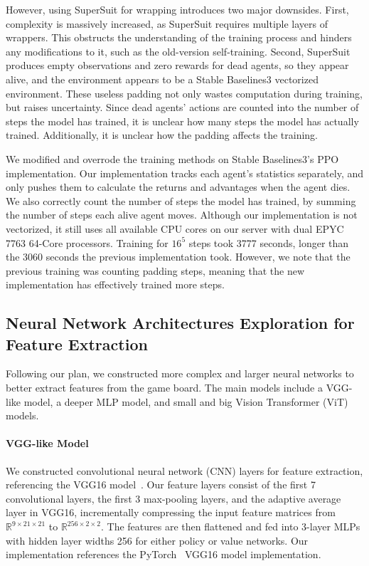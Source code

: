 \documentclass[conference]{IEEEtran}
\begin{document}
However, using SuperSuit for wrapping introduces two major downsides. First,
complexity is massively increased,
as SuperSuit requires multiple layers of wrappers.
This obstructs the understanding of the training process and hinders any
modifications to it, such as the old-version self-training. Second,
SuperSuit produces empty observations and zero rewards for dead agents,
so they appear alive,
and the environment appears to be a Stable Baselines3 vectorized environment.
These useless padding not only wastes computation during training,
but raises uncertainty.
Since dead agents' actions are counted into the number of steps the model has
trained, it is unclear how many steps the model has actually trained.
Additionally, it is unclear how the padding affects the training.

We modified and overrode the training methods on Stable Baselines3's PPO
implementation. Our implementation tracks each agent's statistics separately,
and only pushes them to calculate the returns and advantages when the agent
dies. We also correctly count the number of steps the model has trained,
by summing the number of steps each alive agent moves.
Although our implementation is not vectorized,
it still uses all available CPU cores on our server with dual EPYC 7763 64-Core
processors. Training for $16^5$ steps took 3777 seconds,
longer than the 3060 seconds the previous implementation took. However,
we note that the previous training was counting padding steps,
meaning that the new implementation has effectively trained more steps.

\subsection{Neural Network Architectures Exploration for Feature Extraction}

Following our plan,
we constructed more complex and larger neural networks to better extract
features from the game board. The main models include a VGG-like model,
a deeper MLP model, and small and big Vision Transformer (ViT) models.

\paragraph{VGG-like Model}
We constructed convolutional neural network (CNN) layers for feature extraction,
referencing the VGG16 model~\cite{simonyan2014very}.
Our feature layers consist of the first 7 convolutional layers,
the first 3 max-pooling layers, and the adaptive average layer in VGG16,
incrementally compressing the input feature matrices from $\mathbb R^{9\times
            21\times 21}$ to $\mathbb R^{256\times 2\times 2}$.
The features are then flattened and fed into 3-layer MLPs with hidden layer
widths 256 for either policy or value networks.
Our implementation references the PyTorch~\cite{paszke2019pytorch}
VGG16 model implementation.
\end{document}
